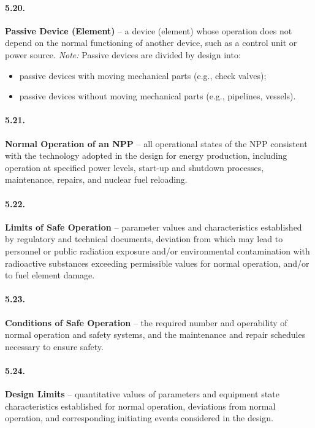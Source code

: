 \documentclass[openright]{bookest}
\begin{document}
\paragraph{5.20.}
\textbf{Passive Device (Element)} -- a device (element) whose operation does not depend on the normal functioning of another device, such as a control unit or power source.  
\textit{Note:} Passive devices are divided by design into:
\begin{itemize}
    \item passive devices with moving mechanical parts (e.g., check valves);
    \item passive devices without moving mechanical parts (e.g., pipelines, vessels).
\end{itemize}

\paragraph{5.21.}
\textbf{Normal Operation of an NPP} -- all operational states of the NPP consistent with the technology adopted in the design for energy production, including operation at specified power levels, start-up and shutdown processes, maintenance, repairs, and nuclear fuel reloading.

\paragraph{5.22.}
\textbf{Limits of Safe Operation} -- parameter values and characteristics established by regulatory and technical documents, deviation from which may lead to personnel or public radiation exposure and/or environmental contamination with radioactive substances exceeding permissible values for normal operation, and/or to fuel element damage.

\paragraph{5.23.}
\textbf{Conditions of Safe Operation} -- the required number and operability of normal operation and safety systems, and the maintenance and repair schedules necessary to ensure safety.

\paragraph{5.24.}
\textbf{Design Limits} -- quantitative values of parameters and equipment state characteristics established for normal operation, deviations from normal operation, and corresponding initiating events considered in the design.
\end{document}
